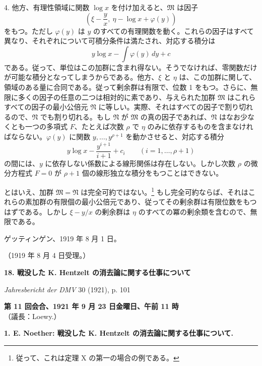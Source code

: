 \documentclass[11pt]{article}
\begin{document}
4. 他方、有理性領域に関数 $\log x$ を付け加えると、$\mathfrak M$ は因子
\[
 \left(\xi-\frac{y}{x},\ \eta-\log x+\varphi(y)\right)
\]
をもつ。ただし $\varphi(y)$ は $y$ のすべての有理関数を動く。これらの因子はすべて異なり、それぞれについて可積分条件は満たされ、対応する積分は
\[
 y\log x-\int\varphi(y)\,dy+c
\]
である。従って、単位はこの加群に含まれ得ない。そうでなければ、零関数だけが可能な積分となってしまうからである。他方、$\xi$ と $\eta$ は、この加群に関して、領域のある量に合同である。従って剰余群は有限で、位数 1 をもつ。さらに、無限に多くの因子の任意の二つは相対的に素であり、与えられた加群 $\mathfrak M$ はこれらすべての因子の最小公倍元 $\mathfrak N$ に等しい。実際、それはすべての因子で割り切れるので、$\mathfrak N$ でも割り切れる。もし $\mathfrak N$ が $\mathfrak M$ の真の因子であれば、$\mathfrak N$ はなお少なくとも一つの多項式 $F$、たとえば次数 $\rho$ で $\eta$ のみに依存するものを含まなければならない。$\varphi(y)$ に関数 $y,\ldots,y^{\rho+1}$ を動かさせると、対応する積分
\[
 y\log x-\frac{y^{i+1}}{i+1}+c_i
 \qquad(i=1,
\ldots,
\rho+1)
\]
の間には、$y$ に依存しない係数による線形関係は存在しない。しかし次数 $\rho$ の微分方程式 $F=0$ が $\rho+1$ 個の線形独立な積分をもつことはできない。

とはいえ、加群 $\mathfrak M=\mathfrak N$ は完全可約ではない。\footnote{従って、これは定理 X の第一の場合の例である。} もし完全可約ならば、それはこれらの素加群の有限個の最小公倍元であり、従ってその剰余群は有限位数をもつはずである。しかし $\xi-y/x$ の剰余群は $\eta$ のすべての冪の剰余類を含むので、無限である。

ゲッティンゲン、1919 年 8 月 1 日。

\begin{center}
（1919 年 8 月 4 日受理。）
\end{center}

\clearpage
\setcounter{footnote}{0}
\begin{center}
{\Large\bfseries 18. 戦没した K. Hentzelt の消去論に関する仕事について}\par
\vspace{1em}
\emph{Jahresbericht der DMV} 30 (1921), p. 101
\end{center}

\begin{center}
\textbf{第 11 回会合、1921 年 9 月 23 日金曜日、午前 11 時}\\
（議長：Loewy.）
\end{center}

\textbf{1. E. Noether: 戦没した K. Hentzelt の消去論に関する仕事について.}
\end{document}
